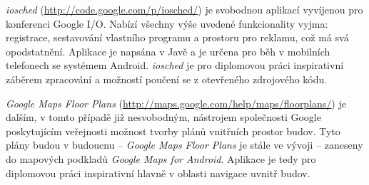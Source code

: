 \emph{iosched} (\url{http://code.google.com/p/iosched/}) je svobodnou aplikací vyvíjenou pro konferenci Google I/O. Nabízí všechny výše uvedené funkcionality vyjma: registrace, sestavování vlastního programu a prostoru pro reklamu, což má svá opodstatnění. Aplikace je napsána v Javě a je určena pro běh v mobilních telefonech se systémem Android. \emph{iosched} je pro diplomovou práci inspirativní záběrem zpracování a možností poučení se z otevřeného zdrojového kódu.

\textit{Google Maps Floor Plans} (\url{http://maps.google.com/help/maps/floorplans/}) je dalším, v tomto případě již nesvobodným, nástrojem společnosti Google poskytujícím veřejnosti možnost tvorby plánů vnitřních prostor budov. Tyto plány budou v budoucnu -- \emph{Google Maps Floor Plans} je stále ve vývoji -- zaneseny do mapových podkladů \emph{Google Maps for Android}. Aplikace je tedy pro diplomovou práci inspirativní hlavně v oblasti navigace uvnitř budov.